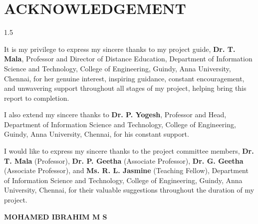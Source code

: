 \chapter*{\uppercase{Acknowledgement}}
\begin{spacing}{1.5}
\begin{sloppypar}

It is my privilege to express my sincere thanks to my project guide,
\textbf{Dr. T. Mala}, Professor and Director of Distance Education,
Department of Information Science and Technology, College of Engineering,
Guindy, Anna University, Chennai, for her genuine interest, inspiring
guidance, constant encouragement, and unwavering support throughout all
stages of my project, helping bring this report to completion.

I also extend my sincere thanks to \textbf{Dr. P. Yogesh}, Professor and
Head, Department of Information Science and Technology, College of
Engineering, Guindy, Anna University, Chennai, for his constant support.

I would like to express my sincere thanks to the project committee
members, \textbf{Dr. T. Mala} (Professor), \textbf{Dr. P. Geetha}
(Associate Professor), \textbf{Dr. G. Geetha} (Associate Professor), and
\textbf{Ms. R. L. Jasmine} (Teaching Fellow), Department of Information
Science and Technology, College of Engineering, Guindy, Anna University,
Chennai, for their valuable suggestions throughout the duration of my project.

\end{sloppypar}
\end{spacing}
\begin{flushright}
\textbf{MOHAMED IBRAHIM M S}
\end{flushright}
